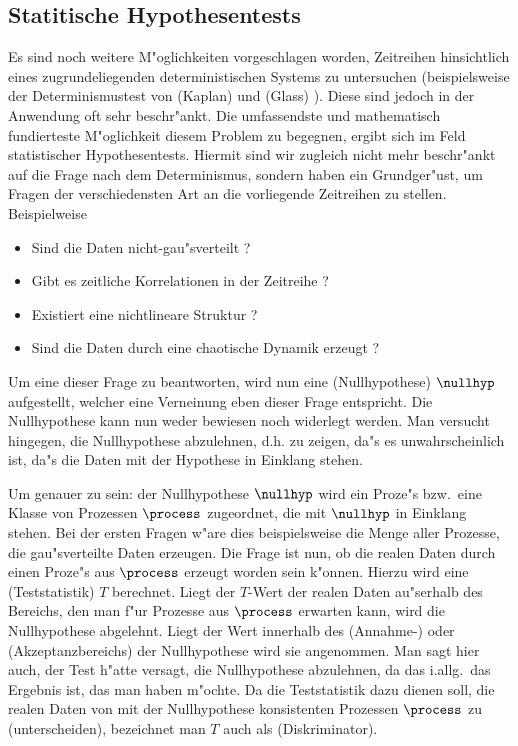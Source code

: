 \subsection{Statitische Hypothesentests}
Es sind noch weitere M"oglichkeiten vorgeschlagen worden, Zeitreihen hinsichtlich eines
zugrundeliegenden deterministischen Systems zu untersuchen (beispielsweise der
Determinismustest von \autor(Kaplan) und \autor(Glass) \cite{kaplan-glass}).  Diese sind
jedoch in der Anwendung oft sehr beschr"ankt.  Die umfassendste und mathematisch
fundierteste M"oglichkeit diesem Problem zu begegnen, ergibt sich im Feld statistischer
Hypothesentests. Hiermit sind wir zugleich nicht mehr beschr"ankt auf die Frage nach dem
Determinismus, sondern haben ein Grundger"ust, um Fragen der verschiedensten Art an die
vorliegende Zeitreihen zu stellen. Beispielweise
\begin{itemize}
\item Sind die Daten nicht-gau"sverteilt ?
\item Gibt es zeitliche Korrelationen in der Zeitreihe ?
\item Existiert eine nichtlineare Struktur ?
\item Sind die Daten durch eine chaotische Dynamik erzeugt ?
\end{itemize}
Um eine dieser Frage zu beantworten, wird nun eine \begriff(Nullhypothese) $\nullhyp$
aufgestellt, welcher eine Verneinung eben dieser Frage entspricht.  Die Nullhypothese kann
nun weder bewiesen noch widerlegt werden. Man versucht hingegen, die Nullhypothese
abzulehnen, d.h. zu zeigen, da"s es unwahrscheinlich ist, da"s die Daten mit der Hypothese
in Einklang stehen.

Um genauer zu sein: der Nullhypothese $\nullhyp$ wird ein Proze"s bzw.\ eine Klasse von
Prozessen $\process$ zugeordnet, die mit $\nullhyp$ in Einklang stehen. Bei der ersten
Fragen w"are dies beispielsweise die Menge aller Prozesse, die gau"sverteilte Daten
erzeugen. Die Frage ist nun, ob die realen Daten durch einen Proze"s aus $\process$
erzeugt worden sein k"onnen. Hierzu wird eine \begriff(Teststatistik) $T$ berechnet. Liegt
der $T$-Wert der realen Daten au"serhalb des Bereichs, den man f"ur Prozesse aus
$\process$ erwarten kann, wird die Nullhypothese abgelehnt. Liegt der Wert innerhalb des
\begriff(Annahme-) oder \begriff(Akzeptanzbereichs) der Nullhypothese wird sie angenommen.
Man sagt hier auch, der Test h"atte versagt, die Nullhypothese abzulehnen, da das i.allg.\ 
das Ergebnis ist, das man haben m"ochte. Da die Teststatistik dazu dienen soll, die realen
Daten von mit der Nullhypothese konsistenten Prozessen $\process$ zu \naja(unterscheiden),
bezeichnet man $T$ auch als \begriff(Diskriminator).

